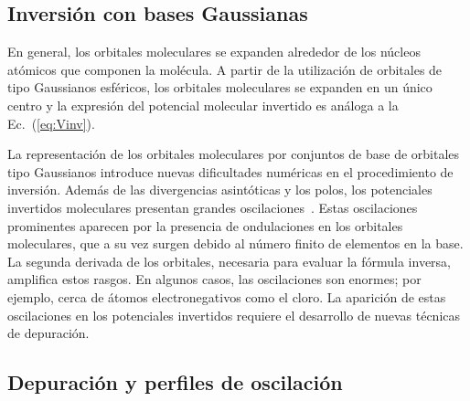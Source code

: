 \subsection{Inversión con bases Gaussianas}
\label{sec:invmol}

En general, los orbitales moleculares se expanden alrededor de los 
núcleos atómicos que componen la molécula. A partir de la utilización
de orbitales de tipo Gaussianos esféricos, los orbitales moleculares se 
expanden en un único centro y la expresión del potencial molecular 
invertido es análoga a la Ec.~(\ref{eq:Vinv}). 

La representación de los orbitales moleculares por conjuntos de base de 
orbitales tipo Gaussianos introduce nuevas dificultades numéricas en el 
procedimiento de inversión. Además de las divergencias asintóticas y los 
polos, los potenciales invertidos moleculares presentan grandes 
oscilaciones~\cite{Schipper:97,Jacob:11,Gaiduk:13}. Estas oscilaciones 
prominentes aparecen por la presencia de ondulaciones en los orbitales 
moleculares, que a su vez surgen debido al número finito de elementos en 
la base. La segunda derivada de los orbitales, necesaria para evaluar la 
fórmula inversa, amplifica estos rasgos. En algunos casos, las 
oscilaciones son enormes; por ejemplo, cerca de átomos electronegativos 
como el cloro. La aparición de estas oscilaciones en los potenciales 
invertidos requiere el desarrollo de nuevas técnicas de depuración.

\subsection{Depuración y perfiles de oscilación}
\label{sec:invmol}

